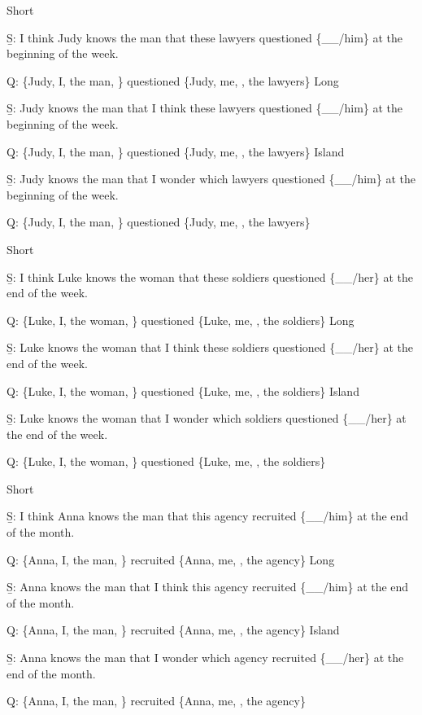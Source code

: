 \pex 
\a Short\par\nobreak
\beginsubsub 
\b{S:} I think Judy knows the man that these lawyers questioned \{\_\_/him\} at the beginning of the week.\par\nobreak
\b{Q:} \{Judy, I, the man, \} questioned \{Judy, me, , the lawyers\}
\endsubsub
\a Long\par\nobreak
\beginsubsub
\b{S:} Judy knows the man that I think these lawyers questioned \{\_\_/him\} at the beginning of the week.\par\nobreak
\b{Q:} \{Judy, I, the man, \} questioned \{Judy, me, , the lawyers\}
\endsubsub
\a Island\par\nobreak
\beginsubsub
\b{S:} Judy knows the man that I wonder which lawyers questioned \{\_\_/him\} at the beginning of the week.\par\nobreak
\b{Q:} \{Judy, I, the man, \} questioned \{Judy, me, , the lawyers\}
\endsubsub
\xe

\pex 
\a Short\par\nobreak
\beginsubsub 
\b{S:} I think Luke knows the woman that these soldiers questioned \{\_\_/her\} at the end of the week.\par\nobreak
\b{Q:} \{Luke, I, the woman, \} questioned \{Luke, me, , the soldiers\}
\endsubsub
\a Long\par\nobreak
\beginsubsub
\b{S:} Luke knows the woman that I think these soldiers questioned \{\_\_/her\} at the end of the week.\par\nobreak
\b{Q:} \{Luke, I, the woman, \} questioned \{Luke, me, , the soldiers\}
\endsubsub
\a Island\par\nobreak
\beginsubsub
\b{S:} Luke knows the woman that I wonder which soldiers questioned \{\_\_/her\} at the end of the week.\par\nobreak
\b{Q:} \{Luke, I, the woman, \} questioned \{Luke, me, , the soldiers\}
\endsubsub
\xe

\pex 
\a Short\par\nobreak
\beginsubsub 
\b{S:} I think Anna knows the man that this agency recruited \{\_\_/him\} at the end of the month.\par\nobreak
\b{Q:} \{Anna, I, the man, \} recruited \{Anna, me, , the agency\}
\endsubsub
\a Long\par\nobreak
\beginsubsub
\b{S:} Anna knows the man that I think this agency recruited \{\_\_/him\} at the end of the month.\par\nobreak
\b{Q:} \{Anna, I, the man, \} recruited \{Anna, me, , the agency\}
\endsubsub
\a Island\par\nobreak
\beginsubsub
\b{S:} Anna knows the man that I wonder which agency recruited \{\_\_/her\} at the end of the month.\par\nobreak
\b{Q:} \{Anna, I, the man, \} recruited \{Anna, me, , the agency\}
\endsubsub
\xe

